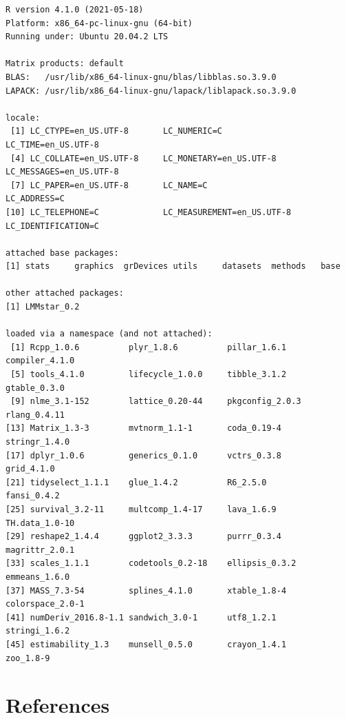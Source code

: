 \documentclass[12pt]{article}
\begin{document}
\begin{verbatim}
R version 4.1.0 (2021-05-18)
Platform: x86_64-pc-linux-gnu (64-bit)
Running under: Ubuntu 20.04.2 LTS

Matrix products: default
BLAS:   /usr/lib/x86_64-linux-gnu/blas/libblas.so.3.9.0
LAPACK: /usr/lib/x86_64-linux-gnu/lapack/liblapack.so.3.9.0

locale:
 [1] LC_CTYPE=en_US.UTF-8       LC_NUMERIC=C               LC_TIME=en_US.UTF-8       
 [4] LC_COLLATE=en_US.UTF-8     LC_MONETARY=en_US.UTF-8    LC_MESSAGES=en_US.UTF-8   
 [7] LC_PAPER=en_US.UTF-8       LC_NAME=C                  LC_ADDRESS=C              
[10] LC_TELEPHONE=C             LC_MEASUREMENT=en_US.UTF-8 LC_IDENTIFICATION=C       

attached base packages:
[1] stats     graphics  grDevices utils     datasets  methods   base     

other attached packages:
[1] LMMstar_0.2

loaded via a namespace (and not attached):
 [1] Rcpp_1.0.6          plyr_1.8.6          pillar_1.6.1        compiler_4.1.0     
 [5] tools_4.1.0         lifecycle_1.0.0     tibble_3.1.2        gtable_0.3.0       
 [9] nlme_3.1-152        lattice_0.20-44     pkgconfig_2.0.3     rlang_0.4.11       
[13] Matrix_1.3-3        mvtnorm_1.1-1       coda_0.19-4         stringr_1.4.0      
[17] dplyr_1.0.6         generics_0.1.0      vctrs_0.3.8         grid_4.1.0         
[21] tidyselect_1.1.1    glue_1.4.2          R6_2.5.0            fansi_0.4.2        
[25] survival_3.2-11     multcomp_1.4-17     lava_1.6.9          TH.data_1.0-10     
[29] reshape2_1.4.4      ggplot2_3.3.3       purrr_0.3.4         magrittr_2.0.1     
[33] scales_1.1.1        codetools_0.2-18    ellipsis_0.3.2      emmeans_1.6.0      
[37] MASS_7.3-54         splines_4.1.0       xtable_1.8-4        colorspace_2.0-1   
[41] numDeriv_2016.8-1.1 sandwich_3.0-1      utf8_1.2.1          stringi_1.6.2      
[45] estimability_1.3    munsell_0.5.0       crayon_1.4.1        zoo_1.8-9
\end{verbatim}

\clearpage

\section*{References}
\label{sec:org039d43e}
\begingroup
\renewcommand{\section}[2]{}
\end{document}
